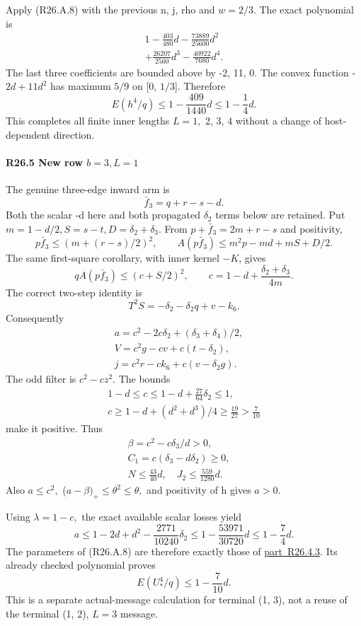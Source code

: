 Apply (R26.A.8) with the previous n, j, rho and \(w=2/3.\) The exact polynomial is
\[
\begin{gathered}
1-\frac{403}{480}d-\frac{73889}{25600}d^2\\
+\frac{26207}{2560}d^3-\frac{40922}{7680}d^4.
\end{gathered}
\]
The last three coefficients are bounded above by -2, 11, 0.
The convex function -\(2d+11d^2\) has maximum \(5/9\) on [0, \(1/3\)]. Therefore
\[
E(h^4/q)\le1-\frac{409}{1440}d\le1-\frac14d.
\]
This completes all finite inner lengths \(L=1,\allowbreak \) 2, 3, 4 without a change of
host-dependent direction.

\paragraph{R26.5 New row \(b=3,\allowbreak  L=1\)}

The genuine three-edge inward arm is
\[
\bar f_3=q+r-s-d.
\]
Both the scalar -d here and both propagated \(\delta_2\) terms below are retained.
Put \(m=1-d/2,\allowbreak  S=s-t,\allowbreak  D=\delta_2+\delta_3.\) From
\(p+\bar f_3=2m+r-s\) and positivity,
\[
p\bar f_3\le(m+(r-s)/2)^2,\qquad
A(p\bar f_3)\le m^2p-md+mS+D/2.
\]
The same first-square corollary, with inner kernel $-K$, gives
\[
qA(p\bar f_3)\le(c+S/2)^2,\qquad
c=1-d+\frac{\delta_2+\delta_3}{4m}.
\]
The correct two-step identity is
\[
T^2S=-\delta_2-\delta_2q+v-k_6.
\]
Consequently
\[
\begin{gathered}
a=c^2-2c\delta_2+(\delta_3+\delta_4)/2,\quad\\
V=c^2g-cv+c(t-\delta_2),\quad\\
j=c^2r-ck_6+c(v-\delta_2g).
\end{gathered}\tag{R26.A.17}
\]
The odd filter is \(c^2-cz^2.\) The bounds
\[
\begin{gathered}
1-d\le c\le1-d+\frac{27}{64}\delta_2\le1,\qquad\\
c\ge1-d+(d^2+d^3)/4\ge\frac{19}{27}>\frac7{10}
\end{gathered}
\]
make it positive. Thus
\[
\begin{gathered}
\beta=c^2-c\delta_3/d>0,\quad\\
C_1=c(\delta_3-d\delta_2)\ge0,\quad\\
N\le\frac{43}{40}d,\quad J_2\le\frac{559}{1280}d.
\end{gathered}
\]
Also \(a\le c^2,\allowbreak \) (\(a-\beta)_+\le \theta^2\le \theta,\allowbreak \) and positivity of h gives \(a>0.\)

Using \(\lambda=1-c,\allowbreak \) the exact available scalar losses yield
\[
a\le1-2d+d^2-\frac{2771}{10240}\delta_2
\le1-\frac{53971}{30720}d\le1-\frac74d.
\]
The parameters of (R26.A.8) are therefore exactly those of \mbox{\hyperref[part:R26.4.3]{part R26.4.3}}.
Its already checked polynomial proves
\[
E(U_*^4/q)\le1-\frac7{10}d.
\]
This is a separate actual-message calculation for terminal (1, 3), not a
reuse of the terminal (1, 2), \(L=3\) message.

